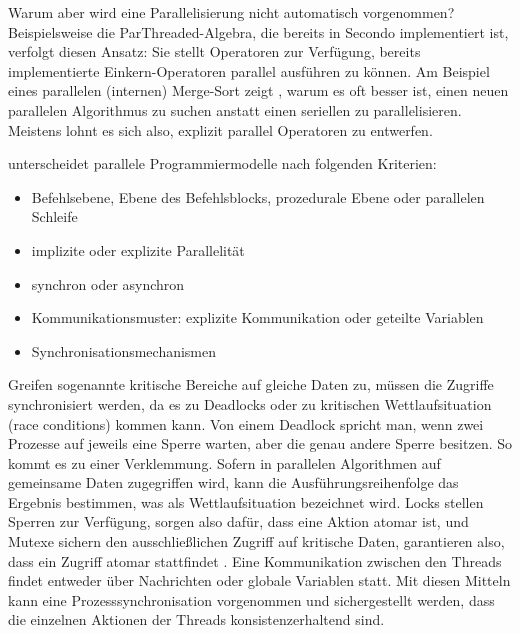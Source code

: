 \documentclass[a4paper,12pt,twoside]{article}
\begin{document}
Warum aber wird eine Parallelisierung nicht automatisch vorgenommen? Beispielsweise die ParThreaded-Algebra, die bereits in Secondo implementiert ist, verfolgt diesen Ansatz: Sie stellt Operatoren zur Verfügung, bereits implementierte Einkern-Operatoren parallel ausführen zu können. Am Beispiel eines parallelen (internen) Merge-Sort zeigt {\textcite{McCool2012}}, warum es oft besser ist, einen neuen parallelen Algorithmus zu suchen anstatt einen seriellen zu parallelisieren. Meistens lohnt es sich also, explizit parallel Operatoren zu entwerfen.

{\textcite[S.104]{Rauber2013}} unterscheidet parallele Programmiermodelle nach folgenden Kriterien:

\begin{itemize}
	\item Befehlsebene, Ebene des Befehlsblocks, prozedurale Ebene oder parallelen Schleife
	\item implizite oder explizite Parallelität
	\item synchron oder asynchron
	\item Kommunikationsmuster: explizite Kommunikation oder geteilte Variablen
	\item Synchronisationsmechanismen
\end{itemize} 

Greifen sogenannte kritische Bereiche auf gleiche Daten zu, müssen die Zugriffe synchronisiert werden, da es zu Deadlocks oder zu kritischen Wettlaufsituation (race conditions) kommen kann.  Von einem Deadlock spricht man, wenn zwei Prozesse auf jeweils eine Sperre warten, aber die genau andere Sperre besitzen. So kommt es zu einer Verklemmung. Sofern in parallelen Algorithmen auf gemeinsame Daten zugegriffen wird, kann die Ausführungsreihenfolge das Ergebnis bestimmen, was als Wettlaufsituation bezeichnet wird. Locks stellen Sperren zur Verfügung, sorgen also dafür, dass eine Aktion atomar ist, und Mutexe sichern den ausschließlichen Zugriff auf kritische Daten, garantieren also, dass ein Zugriff atomar stattfindet {\autocite{Rauber2013}}. Eine Kommunikation zwischen den Threads findet entweder über Nachrichten oder globale Variablen statt. Mit diesen Mitteln kann eine Prozesssynchronisation vorgenommen und sichergestellt werden, dass die einzelnen Aktionen der Threads konsistenzerhaltend sind.
\end{document}
